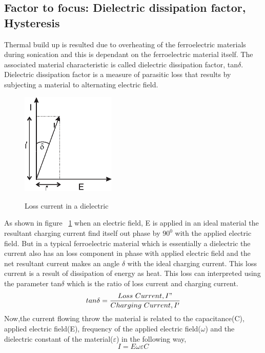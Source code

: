 \subsection{Factor to focus: Dielectric dissipation factor, Hysteresis}
Thermal build up is resulted due to overheating of the ferroelectric materials during sonication and this is  dependant on the ferroelectric material itself. The associated material characteristic is called dielectric dissipation factor, tan$\delta$.
Dielectric dissipation factor is a measure of parasitic loss that results by subjecting a material to alternating electric field. \begin{figure}[t]
\centering
	\includegraphics[width=0.4\textwidth]{E-Icharacteristics.eps}\\
	\caption[Loss current in a dielectric]{Loss current in a dielectric}\label{fig:Loss current in a dielectric}
\end{figure}As shown in figure ~\ref{fig:Loss current in a dielectric} when an electric field, E is applied in an ideal material the resultant charging current find itself out phase by $90^{0}$ with the applied electric field. But in a typical ferroelectric material which is essentially a dielectric the current also has an loss component in phase with applied electric field and the net resultant current makes an angle $\delta$ with the ideal charging current. This loss current is a result of dissipation of energy as heat. This loss can interpreted using the parameter tan$\delta$ which is the ratio of loss current and charging current.
 \begin{equation}\label{Eq:tandeltacurrentloss}
    tan\delta =\frac{Loss\ Current,I"}{Charging\ Current, I'}
\end{equation}
Now,the current flowing throw the material is related to the capacitance(C), applied electric field(E), frequency of the applied electric field($\omega$) and the dielectric constant of the material($\varepsilon$) in the following way,
 \begin{equation}\label{Eq:currentand capacitance}
    I=E\omega\varepsilon C
\end{equation}

